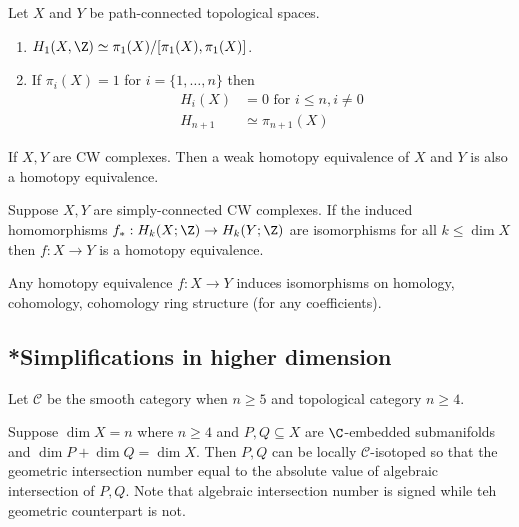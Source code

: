 \documentclass[a4paper]{article}
\begin{document}
Let \(X\) and \(Y\) be path-connected topological spaces.

\begin{theorem}[Hurewicz]\leavevmode
  \begin{enumerate}
  \item \(H_1(X, \Z) \simeq \pi_1(X)/[\pi_1(X), \pi_1(X)]\).
  \item If \(\pi_i(X) = 1\) for \(i = \{1, \dots, n\}\) then
    \begin{align*}
      H_i(X) &= 0 \text{ for } i \leq n, i \neq 0 \\
      H_{n + 1} &\simeq \pi_{n + 1}(X)
    \end{align*}
  \end{enumerate}
\end{theorem}

\begin{theorem}[Whitehead]
  If \(X, Y\) are CW complexes. Then a weak homotopy equivalence of \(X\) and \(Y\) is also a homotopy equivalence.
\end{theorem}

\begin{theorem}
  Suppose \(X, Y\) are simply-connected CW complexes. If the induced homomorphisms \(f_*: H_k(X; \Z) \to H_k(Y; \Z)\) are isomorphisms for all \(k \leq \dim X\) then \(f: X \to Y \) is a homotopy equivalence.
\end{theorem}

\begin{theorem}
  Any homotopy equivalence \(f: X \to Y\) induces isomorphisms on homology, cohomology, cohomology ring structure (for any coefficients).
\end{theorem}

\subsection{*Simplifications in higher dimension}

Let \(\mathcal C\) be the smooth category when \(n \geq 5\) and topological category \(n \geq 4\).

\begin{theorem}
  Suppose \(\dim X = n\) where \(n \geq 4\) and \(P, Q \subseteq X\) are \(\mathcal \C\)-embedded submanifolds and \(\dim P + \dim Q = \dim X\). Then \(P, Q\) can be locally \(\mathcal C\)-isotoped so that the geometric intersection number equal to the absolute value of algebraic intersection of \(P, Q\). Note that algebraic intersection number is signed while teh geometric counterpart is not.
\end{theorem}
\end{document}
